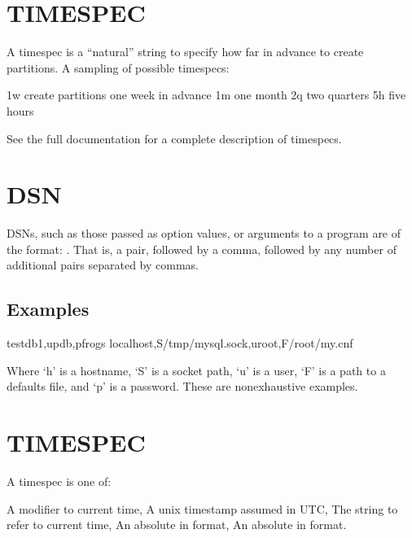 \documentclass[letterpaper,10pt,english]{sphinxmanual}
\begin{document}
\section{TIMESPEC}
\label{\detokenize{mariadb-parted:timespec}}
A timespec is a “natural” string to specify how far in advance to create
partitions. A sampling of possible timespecs:

\begin{sphinxVerbatim}[commandchars=\\\{\}]
1w create partitions one week in advance
1m one month
2q two quarters
5h five hours
\end{sphinxVerbatim}

See the full documentation for a complete description of timespecs.


\section{DSN}
\label{\detokenize{mariadb-parted:dsn}}
DSNs, such as those passed as option values, or arguments to a program
are of the format: . That is, a  pair, followed
by a comma, followed by any number of additional  pairs separated by
commas.


\subsection{Examples}
\label{\detokenize{mariadb-parted:id1}}
\begin{sphinxVerbatim}[commandchars=\\\{\}]
testdb1,updb,pfrogs
localhost,S/tmp/mysql.sock,uroot,F/root/my.cnf
\end{sphinxVerbatim}

Where ‘h’ is a hostname, ‘S’ is a socket path, ‘u’ is a user, ‘F’ is a path
to a defaults file, and ‘p’ is a password. These are non\sphinxhyphen{}exhaustive examples.


\section{TIMESPEC}
\label{\detokenize{mariadb-parted:id2}}
A timespec is one of:

\begin{sphinxVerbatim}[commandchars=\\\{\}]
A modifier to current  time,
A unix timestamp assumed in UTC,
The string  to refer to current  time,
An absolute  in  format,
An absolute  in  format.
\end{sphinxVerbatim}
\end{document}
